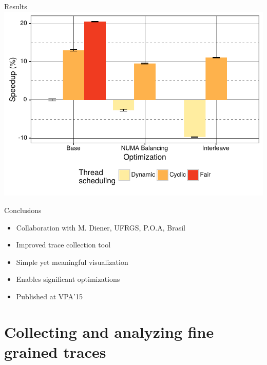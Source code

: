 \documentclass[xcolor={usenames,dvipsnames},hyperref={pdfusetitle}]{beamer}
\begin{document}
\begin{frame}{Results}
    \includegraphics[width=\linewidth]{tabarnac/is_exectime}
\end{frame}

\begin{frame}{Conclusions}
    \begin{itemize}[<+-|alert@+>]
        \item Collaboration with M. Diener, UFRGS, P.O.A, Brasil
        \item Improved trace collection tool
        \item Simple yet meaningful visualization
        \item Enables significant optimizations
        \item Published at VPA'15~\cite{Beniamine15TABARNAC}
    \end{itemize}
\end{frame}

\section{Collecting and analyzing fine grained traces}
\end{document}
